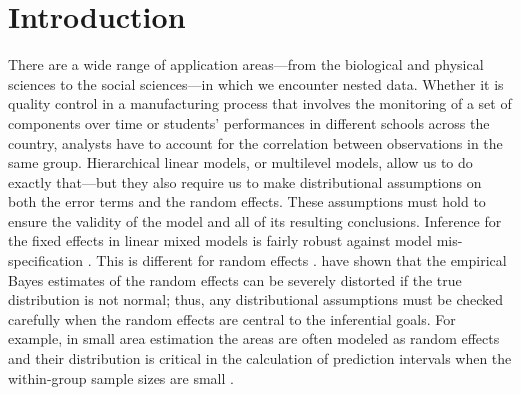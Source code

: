\documentclass[12pt]{article} %
\newcommand{\hh}[1]{{\color{orange} #1}}
\newcommand{\al}[1]{{\color{red} #1}}
\begin{document}
\section{Introduction}\label{sec:intro}
There are a wide range of application areas---from the biological and physical sciences to the social sciences---in which we encounter nested  data.
Whether it is quality control in a manufacturing process that involves the monitoring of a set of components over  time  or students' performances in different schools across the country, analysts have to account for  the correlation between observations in the same group.  Hierarchical linear models, or multilevel models, allow us to do exactly that---but they also require us to make distributional assumptions on both the error terms and the random effects. These assumptions must hold to ensure the validity of the model and all of its resulting conclusions. 
Inference for the fixed effects in linear mixed models is fairly robust against model mis-specification \citep{Butler:1992tx, Verbeke:1997tf}. This is different for random effects \citep{Verbeke:1996va, Verbeke:1997tf}. 
\al{ \citet{Verbeke:1996va} have shown that the empirical Bayes estimates of the random effects can be severely distorted if the true distribution is not normal; thus, any distributional assumptions must be checked carefully when the random effects are central to the inferential goals.}
\al{  For example, in small area estimation the areas are often modeled as random effects and their distribution is critical in the calculation of prediction intervals when the  within-group sample sizes are small \citep[see][for a cogent discussion of this issue]{Jiang:2001dx}. } 
\end{document}
